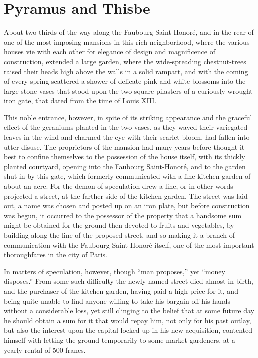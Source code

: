 \chapter{Pyramus and Thisbe}

About two-thirds of the way along the Faubourg Saint-Honoré, and in the
rear of one of the most imposing mansions in this rich neighborhood,
where the various houses vie with each other for elegance of design and
magnificence of construction, extended a large garden, where the
wide-spreading chestnut-trees raised their heads high above the walls
in a solid rampart, and with the coming of every spring scattered a
shower of delicate pink and white blossoms into the large stone vases
that stood upon the two square pilasters of a curiously wrought iron
gate, that dated from the time of Louis XIII.

This noble entrance, however, in spite of its striking appearance and
the graceful effect of the geraniums planted in the two vases, as they
waved their variegated leaves in the wind and charmed the eye with
their scarlet bloom, had fallen into utter disuse. The proprietors of
the mansion had many years before thought it best to confine themselves
to the possession of the house itself, with its thickly planted
courtyard, opening into the Faubourg Saint-Honoré, and to the garden
shut in by this gate, which formerly communicated with a fine
kitchen-garden of about an acre. For the demon of speculation drew a
line, or in other words projected a street, at the farther side of the
kitchen-garden. The street was laid out, a name was chosen and posted
up on an iron plate, but before construction was begun, it occurred to
the possessor of the property that a handsome sum might be obtained for
the ground then devoted to fruits and vegetables, by building along the
line of the proposed street, and so making it a branch of communication
with the Faubourg Saint-Honoré itself, one of the most important
thoroughfares in the city of Paris.

In matters of speculation, however, though “man proposes,” yet “money
disposes.” From some such difficulty the newly named street died almost
in birth, and the purchaser of the kitchen-garden, having paid a high
price for it, and being quite unable to find anyone willing to take his
bargain off his hands without a considerable loss, yet still clinging
to the belief that at some future day he should obtain a sum for it
that would repay him, not only for his past outlay, but also the
interest upon the capital locked up in his new acquisition, contented
himself with letting the ground temporarily to some market-gardeners,
at a yearly rental of 500 francs.

